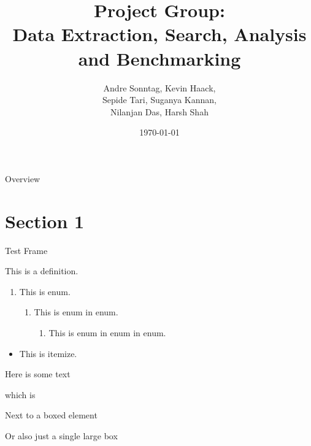 \documentclass{beamer}
\title{Project Group:\\Data Extraction, Search, Analysis and Benchmarking}
\author{Andre Sonntag, Kevin Haack,\\Sepide Tari, Suganya Kannan,\\Nilanjan Das, Harsh Shah}
\institute{Paderborn University}
\date{\today}
\begin{document}
\begin{frame}
  \titlepage
\end{frame}

\begin{frame}{Overview}
\tableofcontents
\end{frame}

\section{Section 1}

\begin{frame}{Test Frame}
	\begin{definition}
		This is a definition.
	\end{definition}
	\begin{enumerate}
		\item This is enum.
		\begin{enumerate}
			\item This is enum in enum.
			\begin{enumerate}
				\item This is enum in enum in enum.
			\end{enumerate}
		\end{enumerate}
	\end{enumerate}
	\begin{itemize}
		\item This is itemize.
	\end{itemize}
	
	\begin{element}[0.49]
		Here is some text

		which is 
	\end{element}
	\hfill
	\begin{boxedelement}[0.49]
		Next to a boxed element
	\end{boxedelement}
	
	\begin{boxedelement}
		Or also just a single large box
	\end{boxedelement}
\end{frame}
\end{document}
